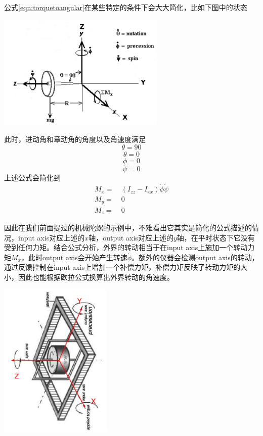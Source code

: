 \documentclass[11pt]{article}
\begin{document}
公式\ref{eqn:torquetoangular}在某些特定的条件下会大大简化，比如下图中的状态

\begin{center}
\includegraphics[width=0.6\textwidth]{images/gyroframe2.png}
\end{center}

此时，进动角和章动角的角度以及角速度满足
$$
\theta = 90
$$
$$
\dot{\theta} = 0
$$
$$
\ddot{\phi} = 0
$$
$$
\ddot{\psi} = 0
$$
上述公式会简化到
\begin{align}\label{eqn:torquetoangularsimple}
M_x = &	\ (I_{zz}-I_{xx})\dot{\phi}\dot{\psi} \\ 
M_y = & \ 0	\\
M_z = & \ 0
\end{align}

因此在我们前面提过的机械陀螺的示例中，不难看出它其实是简化的公式描述的情况，input axis对应上述的$x$轴，output axis对应上述的$y$轴，在平时状态下它没有受到任何力矩。结合公式分析，外界的转动相当于在input axis上施加一个转动力矩$M_x$，此时output axis会开始产生转速$\dot{\phi}$。额外的仪器会检测output axis的转动，通过反馈控制在input axis上增加一个补偿力矩，补偿力矩反映了转动力矩的大小，因此也能根据欧拉公式换算出外界转动的角速度。

\begin{center}
\includegraphics[width=0.4\textwidth]{images/gyroscopeAxesR.png}
\end{center}
\end{document}
